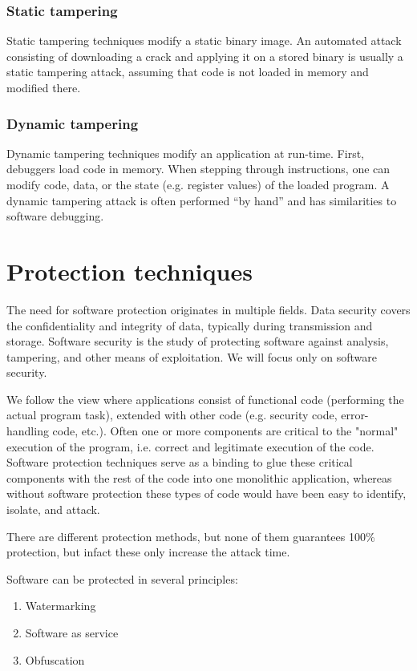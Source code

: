 \documentclass[a4paper,12pt]{article}
\begin{document}
\subsubsection{Static tampering}
Static tampering techniques modify a static binary image.
An automated attack consisting of downloading a crack and applying it on a
stored binary is usually a static tampering attack, assuming that code is not
loaded in memory and modified there.

\subsubsection{Dynamic tampering}
Dynamic tampering techniques modify an application
at run-time. First, debuggers load code in memory. When stepping through
instructions, one can modify code, data, or the state (e.g. register values) of
the loaded program. A dynamic tampering attack is often performed “by hand”
and has similarities to software debugging.

\section{Protection techniques}
The need for software protection originates in multiple fields. Data security
covers the confidentiality and integrity of data, typically during transmission
and storage. Software security is the study of protecting software against
analysis, tampering, and other means of exploitation. We will focus only on
software security.

We follow the view where applications consist of functional code (performing
the actual program task), extended with other code (e.g. security code,
error-handling code, etc.). Often one or more components are critical to the
"normal" execution of the program, i.e. correct and legitimate execution of
the code. Software protection techniques serve as a binding to glue these
critical components with the rest of the code into one monolithic application,
whereas without software protection these types of code would have been easy to
identify, isolate, and attack.

There are different protection methods, but none of them guarantees 100\%
protection, but infact these only increase the attack time.

Software can be protected in several principles:

\begin{enumerate}
\item Watermarking
\item Software as service
\item Obfuscation
\end{enumerate}
\end{document}
